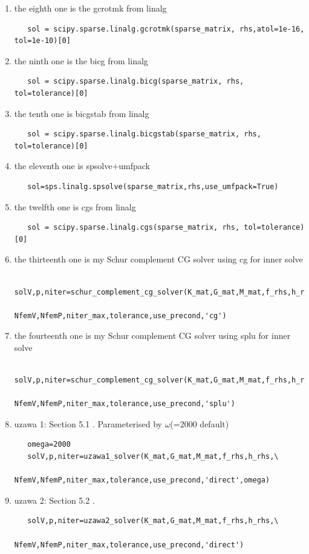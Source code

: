 \begin{enumerate}
\item the eighth one is the gcrotmk from linalg
\begin{lstlisting}
   sol = scipy.sparse.linalg.gcrotmk(sparse_matrix, rhs,atol=1e-16, tol=1e-10)[0]
\end{lstlisting}
\item the ninth one is the bicg from linalg
\begin{lstlisting}
   sol = scipy.sparse.linalg.bicg(sparse_matrix, rhs, tol=tolerance)[0]
\end{lstlisting}
\item the tenth one is bicgstab from linalg
\begin{lstlisting}
   sol = scipy.sparse.linalg.bicgstab(sparse_matrix, rhs, tol=tolerance)[0]
\end{lstlisting}
\item the eleventh one is spsolve+umfpack 
\begin{lstlisting}
   sol=sps.linalg.spsolve(sparse_matrix,rhs,use_umfpack=True)
\end{lstlisting}
\item the twelfth one is cgs from linalg
\begin{lstlisting}
   sol = scipy.sparse.linalg.cgs(sparse_matrix, rhs, tol=tolerance)[0]
\end{lstlisting}
\item the thirteenth one is my Schur complement CG solver using cg for inner solve
\begin{lstlisting}
   solV,p,niter=schur_complement_cg_solver(K_mat,G_mat,M_mat,f_rhs,h_rhs,\
                                           NfemV,NfemP,niter_max,tolerance,use_precond,'cg')
\end{lstlisting}
\item the fourteenth one is my Schur complement CG solver using splu for inner solve
\begin{lstlisting}
   solV,p,niter=schur_complement_cg_solver(K_mat,G_mat,M_mat,f_rhs,h_rhs,\
                                           NfemV,NfemP,niter_max,tolerance,use_precond,'splu')
\end{lstlisting}
\item uzawa 1: Section 5.1 \cite{braess}. Parameterised by $\omega$(=2000 default)
\begin{lstlisting}
   omega=2000
   solV,p,niter=uzawa1_solver(K_mat,G_mat,M_mat,f_rhs,h_rhs,\
                       NfemV,NfemP,niter_max,tolerance,use_precond,'direct',omega)
\end{lstlisting}

\item uzawa 2: Section 5.2 \cite{braess}. 
\begin{lstlisting}
   solV,p,niter=uzawa2_solver(K_mat,G_mat,M_mat,f_rhs,h_rhs,\
                       NfemV,NfemP,niter_max,tolerance,use_precond,'direct')
\end{lstlisting}




\end{enumerate}


